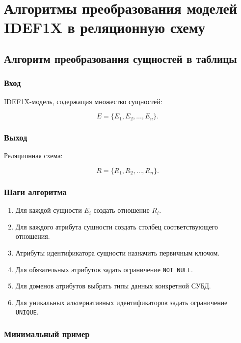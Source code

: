 \documentclass[12pt,a4paper]{article}
\theoremstyle{remark}
\begin{document}
\section{Алгоритмы преобразования моделей IDEF1X в реляционную схему}

\subsection{Алгоритм преобразования сущностей в таблицы}

\subsubsection*{Вход}

IDEF1X-модель, содержащая множество сущностей:

\[
    E = \{E_1, E_2, \ldots, E_n\}.
\]

\subsubsection*{Выход}

Реляционная схема:

\[
    R = \{R_1, R_2, \ldots, R_n\}.
\]

\subsubsection*{Шаги алгоритма}

\begin{enumerate}
    \item Для каждой сущности $E_i$ создать отношение $R_i$.
    \item Для каждого атрибута сущности создать столбец соответствующего отношения.
    \item Атрибуты идентификатора сущности назначить первичным ключом.
    \item Для обязательных атрибутов задать ограничение \texttt{NOT NULL}.
    \item Для доменов атрибутов выбрать типы данных конкретной СУБД.
    \item Для уникальных альтернативных идентификаторов задать ограничение \texttt{UNIQUE}.
\end{enumerate}

\subsubsection*{Минимальный пример}
\end{document}
